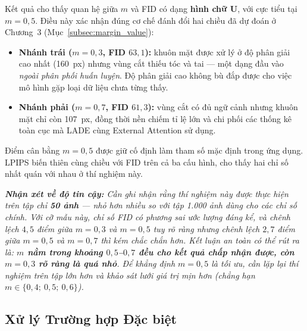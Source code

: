 Kết quả cho thấy quan hệ giữa $m$ và FID có dạng \textbf{hình chữ U}, với cực tiểu tại $m = 0{,}5$. Điều này xác nhận đúng cơ chế đánh đổi hai chiều đã dự đoán ở Chương~3 (Mục~\ref{subsec:margin_value}):

\begin{itemize}
    \item \textbf{Nhánh trái ($m = 0{,}3$, FID $63{,}1$):} khuôn mặt được xử lý ở độ phân giải cao nhất (160~px) nhưng vùng cắt thiếu tóc và tai --- một dạng đầu vào \textit{ngoài phân phối huấn luyện}. Độ phân giải cao không bù đắp được cho việc mô hình gặp loại dữ liệu chưa từng thấy.
    \item \textbf{Nhánh phải ($m = 0{,}7$, FID $61{,}3$):} vùng cắt có đủ ngữ cảnh nhưng khuôn mặt chỉ còn 107~px, đồng thời nền chiếm tỉ lệ lớn và chi phối các thống kê toàn cục mà LADE cùng External Attention sử dụng.
\end{itemize}

Điểm cân bằng $m = 0{,}5$ được giữ cố định làm tham số mặc định trong ứng dụng. LPIPS biến thiên cùng chiều với FID trên cả ba cấu hình, cho thấy hai chỉ số nhất quán với nhau ở thí nghiệm này.

\medskip
\noindent\textit{\textbf{Nhận xét về độ tin cậy:} Cần ghi nhận rằng thí nghiệm này được thực hiện trên tập chỉ \textbf{50 ảnh} --- nhỏ hơn nhiều so với tập 1.000 ảnh dùng cho các chỉ số chính. Với cỡ mẫu này, chỉ số FID có phương sai ước lượng đáng kể, và chênh lệch $4{,}5$ điểm giữa $m = 0{,}3$ và $m = 0{,}5$ tuy rõ ràng nhưng chênh lệch $2{,}7$ điểm giữa $m = 0{,}5$ và $m = 0{,}7$ thì kém chắc chắn hơn. Kết luận an toàn có thể rút ra là: \textbf{$m$ nằm trong khoảng $0{,}5$--$0{,}7$ đều cho kết quả chấp nhận được, còn $m = 0{,}3$ rõ ràng là quá nhỏ}. Để khẳng định $m = 0{,}5$ là tối ưu, cần lặp lại thí nghiệm trên tập lớn hơn và khảo sát lưới giá trị mịn hơn (chẳng hạn $m \in \{0{,}4;\ 0{,}5;\ 0{,}6\}$).}

\subsection{Xử lý Trường hợp Đặc biệt}
\label{subsec:edge_cases_eval}


